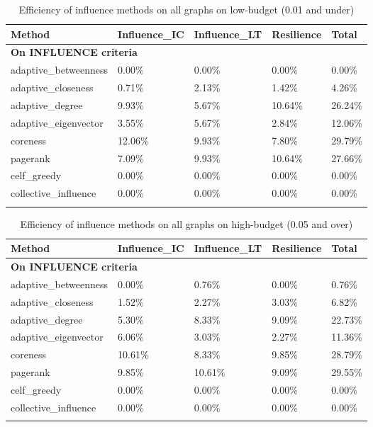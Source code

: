 \begin{longtable}[c]{|l|l|l|l|l|}
	\hline
	\textbf{Method} & \textbf{Influence\_IC} & \textbf{Influence\_LT} & \textbf{Resilience} & \textbf{Total} \\ \hline
	\endfirsthead
	\endhead
	\multicolumn{5}{|l|}{\textbf{On INFLUENCE criteria}}         \\ \hline
	adaptive\_betweenness & 0.00\%  & 0.00\%  & 0.00\%  & 0.00\%  \\ \hline
	adaptive\_closeness   & 0.71\%  & 2.13\%  & 1.42\%  & 4.26\%  \\ \hline
	adaptive\_degree      & 9.93\%  & 5.67\%  & 10.64\% & 26.24\% \\ \hline
	adaptive\_eigenvector & 3.55\%  & 5.67\%  & 2.84\%  & 12.06\% \\ \hline
	coreness              & 12.06\% & 9.93\%  & 7.80\%  & 29.79\% \\ \hline
	pagerank              & 7.09\%  & 9.93\%  & 10.64\% & 27.66\% \\ \hline
	celf\_greedy          & 0.00\%  & 0.00\%  & 0.00\%  & 0.00\%  \\ \hline
	collective\_influence & 0.00\%  & 0.00\%  & 0.00\%  & 0.00\%  \\ \hline
	\caption[IMine efficiency of influence methods on low budget]{Efficiency of influence methods on all graphs on low-budget (0.01 and under)}
	\label{tab:inf-efficient-min-budget}
\end{longtable}

\begin{longtable}[c]{|l|l|l|l|l|}
	\hline
	\textbf{Method} & \textbf{Influence\_IC} & \textbf{Influence\_LT} & \textbf{Resilience} & \textbf{Total} \\ \hline
	\endfirsthead
	\endhead
	\multicolumn{5}{|l|}{\textbf{On INFLUENCE criteria}}         \\ \hline
	adaptive\_betweenness & 0.00\%  & 0.76\%  & 0.00\% & 0.76\%  \\ \hline
	adaptive\_closeness   & 1.52\%  & 2.27\%  & 3.03\% & 6.82\%  \\ \hline
	adaptive\_degree      & 5.30\%  & 8.33\%  & 9.09\% & 22.73\% \\ \hline
	adaptive\_eigenvector & 6.06\%  & 3.03\%  & 2.27\% & 11.36\% \\ \hline
	coreness              & 10.61\% & 8.33\%  & 9.85\% & 28.79\% \\ \hline
	pagerank              & 9.85\%  & 10.61\% & 9.09\% & 29.55\% \\ \hline
	celf\_greedy          & 0.00\%  & 0.00\%  & 0.00\% & 0.00\%  \\ \hline
	collective\_influence & 0.00\%  & 0.00\%  & 0.00\% & 0.00\%  \\ \hline
	\caption[IMine efficiency of influence methods on high budget]{Efficiency of influence methods on all graphs on high-budget (0.05 and over)}
	\label{tab:inf-efficient-max-budget}
\end{longtable}

